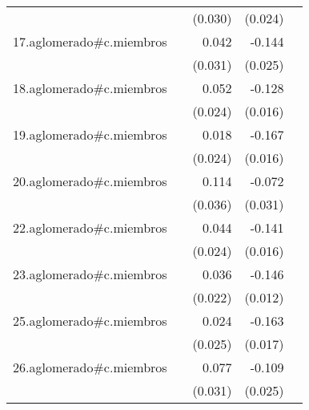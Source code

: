{\begin{longtable}{l*{4}{D{.}{.}{-1}}}
            &                     &     (0.030)         &     (0.024)         &                     \\
\addlinespace
17.aglomerado#c.miembros&                     &       0.042         &      -0.144\sym{***}&                     \\
            &                     &     (0.031)         &     (0.025)         &                     \\
\addlinespace
18.aglomerado#c.miembros&                     &       0.052\sym{*}  &      -0.128\sym{***}&                     \\
            &                     &     (0.024)         &     (0.016)         &                     \\
\addlinespace
19.aglomerado#c.miembros&                     &       0.018         &      -0.167\sym{***}&                     \\
            &                     &     (0.024)         &     (0.016)         &                     \\
\addlinespace
20.aglomerado#c.miembros&                     &       0.114\sym{**} &      -0.072\sym{*}  &                     \\
            &                     &     (0.036)         &     (0.031)         &                     \\
\addlinespace
22.aglomerado#c.miembros&                     &       0.044         &      -0.141\sym{***}&                     \\
            &                     &     (0.024)         &     (0.016)         &                     \\
\addlinespace
23.aglomerado#c.miembros&                     &       0.036         &      -0.146\sym{***}&                     \\
            &                     &     (0.022)         &     (0.012)         &                     \\
\addlinespace
25.aglomerado#c.miembros&                     &       0.024         &      -0.163\sym{***}&                     \\
            &                     &     (0.025)         &     (0.017)         &                     \\
\addlinespace
26.aglomerado#c.miembros&                     &       0.077\sym{*}  &      -0.109\sym{***}&                     \\
            &                     &     (0.031)         &     (0.025)         &                     \\

\end{longtable}}
